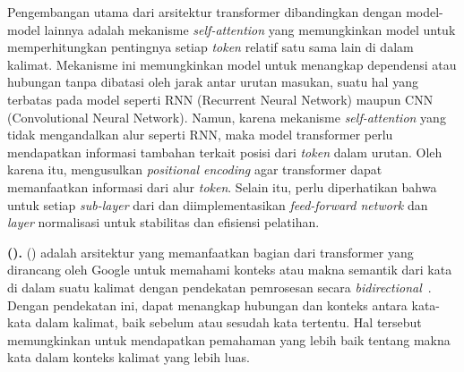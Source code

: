 Pengembangan utama dari arsitektur transformer dibandingkan dengan model-model \nn{} lainnya adalah mekanisme \textit{self-attention} yang memungkinkan model untuk memperhitungkan pentingnya setiap \textit{token} relatif satu sama lain di dalam kalimat. Mekanisme ini memungkinkan model untuk menangkap dependensi atau hubungan tanpa dibatasi oleh jarak antar urutan masukan, suatu hal yang terbatas pada model seperti RNN (Recurrent Neural Network) maupun CNN (Convolutional Neural Network). Namun, karena mekanisme \textit{self-attention} yang tidak mengandalkan alur seperti RNN, maka model transformer perlu mendapatkan informasi tambahan terkait posisi dari \textit{token} dalam urutan. Oleh karena itu, \citet{vaswani2017attention} mengusulkan \textit{positional encoding} agar transformer dapat memanfaatkan informasi dari alur \textit{token}. Selain itu, perlu diperhatikan bahwa untuk setiap \textit{sub-layer} dari \encoder{} dan \decoder{} diimplementasikan \textit{feed-forward network} dan \textit{layer} normalisasi untuk stabilitas dan efisiensi pelatihan.

\vspace{2mm}
\noindent\textbf{\lbert{} (\bert{}).}
\lbert{} (\bert{}) adalah arsitektur yang memanfaatkan bagian \encoder{} dari transformer yang dirancang oleh Google untuk memahami konteks atau makna semantik dari kata di dalam suatu kalimat dengan pendekatan pemrosesan secara \textit{bidirectional}~\citep{devlin2018bert}. Dengan pendekatan ini, \bert{} dapat menangkap hubungan dan konteks antara kata-kata dalam kalimat, baik sebelum atau sesudah kata tertentu. Hal tersebut memungkinkan \bert{} untuk mendapatkan pemahaman yang lebih baik tentang makna kata dalam konteks kalimat yang lebih luas.

